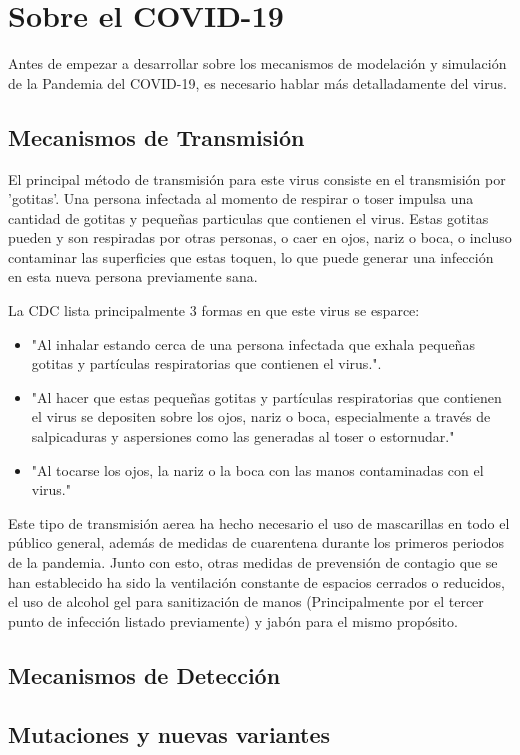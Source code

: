 \section{Sobre el COVID-19}
Antes de empezar a desarrollar sobre los mecanismos de modelación y simulación de la Pandemia del COVID-19, es necesario hablar más detalladamente del virus.

\subsection*{Mecanismos de Transmisión}
El principal método de transmisión para este virus consiste en el transmisión por 'gotitas'. Una persona infectada al momento de respirar o toser impulsa una cantidad de gotitas y pequeñas particulas que contienen el virus. Estas gotitas pueden y son respiradas por otras personas, o caer en ojos, nariz o boca, o incluso contaminar las superficies que estas toquen, lo que puede generar una infección en esta nueva persona previamente sana. \cite{cdc_2021}

La CDC lista principalmente 3 formas en que este virus se esparce:

\begin{itemize}
    \item "Al inhalar estando cerca de una persona infectada que exhala pequeñas gotitas y partículas respiratorias que contienen el virus.".
    \item "Al hacer que estas pequeñas gotitas y partículas respiratorias que contienen el virus se depositen sobre los ojos, nariz o boca, especialmente a través de salpicaduras y aspersiones como las generadas al toser o estornudar."
    \item "Al tocarse los ojos, la nariz o la boca con las manos contaminadas con el virus."
\end{itemize}

Este tipo de transmisión aerea ha hecho necesario el uso de mascarillas en todo el público general, además de medidas de cuarentena durante los primeros periodos de la pandemia. Junto con esto, otras medidas de prevensión de contagio que se han establecido ha sido la ventilación constante de espacios cerrados o reducidos, el uso de alcohol gel para sanitización de manos (Principalmente por el tercer punto de infección listado previamente) y jabón para el mismo propósito. 

\subsection*{Mecanismos de Detección}

\subsection*{Mutaciones y nuevas variantes}